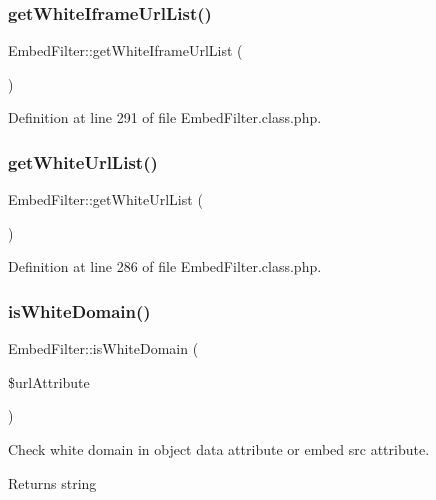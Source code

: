 \subsubsection{\texorpdfstring{get\+White\+Iframe\+Url\+List()}{getWhiteIframeUrlList()}}
{\footnotesize\ttfamily Embed\+Filter\+::get\+White\+Iframe\+Url\+List (\begin{DoxyParamCaption}{ }\end{DoxyParamCaption})}



Definition at line 291 of file Embed\+Filter.\+class.\+php.

\mbox{\label{classEmbedFilter_a7e931adc623954f9a372b4ea4976f44f}} 
\subsubsection{\texorpdfstring{get\+White\+Url\+List()}{getWhiteUrlList()}}
{\footnotesize\ttfamily Embed\+Filter\+::get\+White\+Url\+List (\begin{DoxyParamCaption}{ }\end{DoxyParamCaption})}



Definition at line 286 of file Embed\+Filter.\+class.\+php.

\mbox{\label{classEmbedFilter_a12fcd3bdd961d247598d003b537b5e7f}} 
\subsubsection{\texorpdfstring{is\+White\+Domain()}{isWhiteDomain()}}
{\footnotesize\ttfamily Embed\+Filter\+::is\+White\+Domain (\begin{DoxyParamCaption}\item[{}]{\$url\+Attribute }\end{DoxyParamCaption})}

Check white domain in object data attribute or embed src attribute. \begin{DoxyReturn}{Returns}
string 
\end{DoxyReturn}


